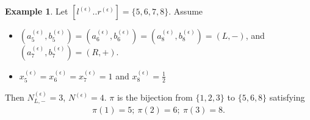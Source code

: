 \documentclass[11pt]{amsart}
\theoremstyle{plain}
\theoremstyle{definition}
\newtheorem{example}[theorem]{Example}
\theoremstyle{remark}
\numberwithin{equation}{section}
\numberwithin{theorem}{section}
\numberwithin{figure}{section}
\begin{document}
\begin{example}\label{ex213}Let $[l^{(\epsilon)}..r^{(\epsilon)}]=\{5,6,7,8\}$. Assume 
\begin{itemize}
\item $(a_5^{(\epsilon)},b_5^{(\epsilon)}) 
=(a_6^{(\epsilon)},b_6^{(\epsilon)})=(a_8^{(\epsilon)},b_8^{(\epsilon)})=(L,-)$, and $(a_7^{(\epsilon)},b_7^{(\epsilon)})=(R,+)$. 
\item $x_5^{(\epsilon)}=x_6^{(\epsilon)}=x_7^{(\epsilon)}=1$ and $x_8^{(\epsilon)}=\frac{1}{2}$
\end{itemize}
Then $N^{(\epsilon)}_{L,-}=3$, $N^{(\epsilon)}=4$. 
$\pi$ is the bijection from $\{1,2,3\}$ to $\{5,6,8\}$ satisfying
\begin{align*}
\pi(1)=5;\ \pi(2)=6;\ \pi(3)=8.
\end{align*}


\end{example}
\end{document}
